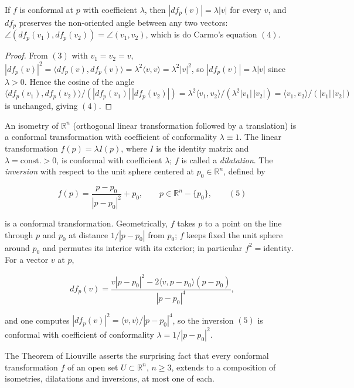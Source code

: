 \begin{lemma}
  \label{lem:dc-ch8-5-conformal-angle}
  \leanok
  If $f$ is conformal at $p$ with coefficient $\lambda$, then $|df_p(v)|=\lambda|v|$
  for every $v$, and $df_p$ preserves the non-oriented angle between any two
  vectors: $\angle(df_p(v_1),df_p(v_2))=\angle(v_1,v_2)$, which is do Carmo's
  equation $(4)$.
\end{lemma}
\begin{proof}
  \leanok
  From $(3)$ with $v_1=v_2=v$, $|df_p(v)|^2=\langle df_p(v),df_p(v)\rangle
  =\lambda^2\langle v,v\rangle=\lambda^2|v|^2$, so $|df_p(v)|=\lambda|v|$ since
  $\lambda>0$. Hence the cosine of the angle
  $\langle df_p(v_1),df_p(v_2)\rangle/(|df_p(v_1)|\,|df_p(v_2)|)
  =\lambda^2\langle v_1,v_2\rangle/(\lambda^2|v_1|\,|v_2|)
  =\langle v_1,v_2\rangle/(|v_1|\,|v_2|)$
  is unchanged, giving $(4)$.
\end{proof}

\begin{example}
  \label{ex:dc-ch8-5-1}
  \leanok
  An isometry of $\mathbb{R}^n$ (orthogonal linear transformation followed by a
  translation) is a conformal transformation with coefficient of conformality
  $\lambda\equiv 1$. The linear transformation $f(p)=\lambda I(p)$, where $I$ is the
  identity matrix and $\lambda=\text{const.}>0$, is conformal with coefficient
  $\lambda$; $f$ is called a \emph{dilatation}. The \emph{inversion} with respect to the unit
  sphere centered at $p_0\in\mathbb{R}^n$, defined by
  
  $$
  f(p)=\frac{p-p_0}{|p-p_0|^2}+p_0,\qquad p\in\mathbb{R}^n-\{p_0\},\qquad(5)
  $$
  
  is a conformal transformation. Geometrically, $f$ takes $p$ to a point on the line
  through $p$ and $p_0$ at distance $1/|p-p_0|$ from $p_0$; $f$ keeps fixed the unit
  sphere around $p_0$ and permutes its interior with its exterior; in particular
  $f^2=\text{identity}$. For a vector $v$ at $p$,
  
  $$
  df_p(v)=\frac{v|p-p_0|^2-2\langle v,p-p_0\rangle(p-p_0)}{|p-p_0|^4},
  $$
  
  and one computes $|df_p(v)|^2=\langle v,v\rangle/|p-p_0|^4$, so the inversion $(5)$
  is conformal with coefficient of conformality $\lambda=1/|p-p_0|^2$.
  
  The Theorem of Liouville asserts the surprising fact that every conformal
  transformation $f$ of an open set $U\subset\mathbb{R}^n$, $n\geq 3$, extends to a
  composition of isometries, dilatations and inversions, at most one of each.
\end{example}

